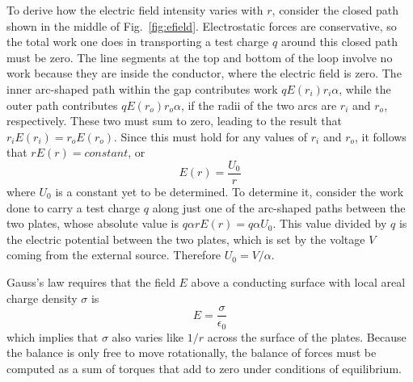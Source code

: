 \documentclass{revtex4}
\begin{document}
To derive how the electric field intensity varies with $r$, consider the
closed path shown in the middle of Fig.~\ref{fig:efield}.  Electrostatic forces
are conservative, so the total work one does in transporting a test charge
$q$ around this closed path must be zero.  The line segments at the top and
bottom of the loop involve no work because they are inside the conductor,
where the electric field is zero.  The inner arc-shaped path within the gap
contributes work $qE(r_i)r_i\alpha$, while the outer path contributes
$qE(r_o)r_o\alpha$, if the radii of the two arcs are $r_i$ and $r_o$,
respectively.  These two must sum to zero, leading to the result that
$r_iE(r_i)=r_oE(r_o)$.  Since this must hold for any values of $r_i$ and
$r_o$, it follows that $rE(r)=constant$, or
\begin{equation}
E(r)=\frac{U_0}{r}
\label{eq:Eofr}
\end{equation}
where $U_0$ is a constant yet to be determined.  To determine it,
consider the work done to carry a test charge $q$ along just one of
the arc-shaped paths between the two plates, whose absolute value is
$q\alpha rE(r)=q\alpha U_0$.  This value divided by $q$ is the
electric potential between the two plates, which is set by the voltage
$V$ coming from the external source.  Therefore $U_0=V/\alpha$.

Gauss's law requires
that the field $E$ above a conducting surface with local areal charge
density $\sigma$ is
\begin{equation}
E=\frac{\sigma}{\epsilon_0}
\end{equation}
which implies that $\sigma$ also varies like $1/r$ across the surface
of the plates.  Because the balance is only free to move rotationally,
the balance of forces must be computed as a sum of torques that add to
zero under conditions of equilibrium.
\end{document}
